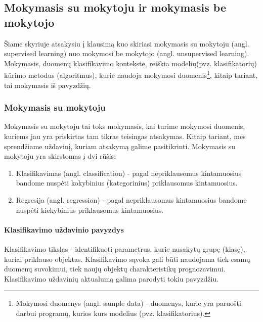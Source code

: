\subsection{Mokymasis su mokytoju ir mokymasis be mokytojo}

Šiame skyriuje atsakysiu į klausimą kuo skiriasi mokymasis su
mokytoju (angl. supervised learning) nuo mokymosi be mokytojo (angl.
unsupervised learning). Mokymasis, duomenų klasifikavimo kontekste, reiškia
modelių(pvz. klasifikatorių) kūrimo metodus (algoritmus), kurie naudoja
mokymosi duomenis\footnote{Mokymosi duomenys (angl. sample data) - duomenys,
kurie yra paruošti darbui programų, kurios kurs modelius (pvz.
klasifikatorius).}, kitaip tariant, tai mokymasis iš pavyzdžių.

\subsubsection{Mokymasis su mokytoju}

Mokymasis su mokytoju tai toks mokymasis, kai turime mokymosi duomenis, kuriems jau
yra priskirtas tam tikras teisingas atsakymas. Kitaip tariant, mes sprendžiame
uždavinį, kuriam atsakymą galime pasitikrinti. Mokymasis su mokytoju yra
skirstomas į dvi rūšis:
\begin{enumerate}
  \item Klasifikavimas (angl. classification) - pagal nepriklausomus
  kintamuosius bandome nuspėti kokybinius (kategorinius) priklausomus
  kintamuosius.
  \item Regresija (angl. regression) - pagal nepriklausomus kintamuosius bandome
  nuspėti kiekybinius priklausomus kintamuosius.
\end{enumerate} 



\paragraph{Klasifikavimo uždavinio pavyzdys}

Klasifikavimo tikslas - identifikuoti parametrus, kurie nusakytų grupę
(klasę), kuriai priklauso objektas. Klasifikavimo sąvoka gali būti naudojama tiek esamų
duomenų suvokimui, tiek naujų objektų charakteristikų prognozavimui.
Klasifikavimo uždavinių aktualumą galima parodyti tokiu pavyzdžiu.

